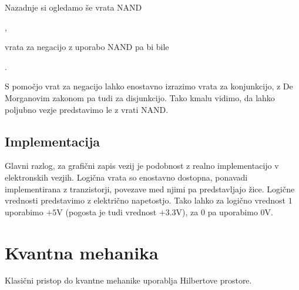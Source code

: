\documentclass[mat1]{fmfdelo}
\begin{document}
Nazadnje si ogledamo še vrata NAND
\begin{center}
    ,
\end{center}
vrata za negacijo z uporabo NAND pa bi bile
\begin{center}
    .
\end{center}
S pomočjo vrat za negacijo lahko enostavno izrazimo vrata za konjunkcijo, z De Morganovim zakonom pa tudi za disjunkcijo. Tako kmalu vidimo, da lahko poljubno vezje predstavimo le z vrati NAND.

\subsection{Implementacija}
Glavni razlog, za grafični zapis vezij je podobnost z realno implementacijo v elektronskih vezjih. Logična vrata so enostavno dostopna, ponavadi implementirana z tranzistorji, povezave med njimi pa predstavljajo žice. Logične vrednosti predstavimo z električno napetostjo. Tako lahko za logično vrednost \(1\) uporabimo \(+5\)V (pogosta je tudi vrednost \(+3.3\)V), za \(0\) pa uporabimo \(0\)V.


\section{Kvantna mehanika}
Klasični pristop do kvantne mehanike uporablja Hilbertove prostore\cite[stran 12]{mathforqm}.
\end{document}
